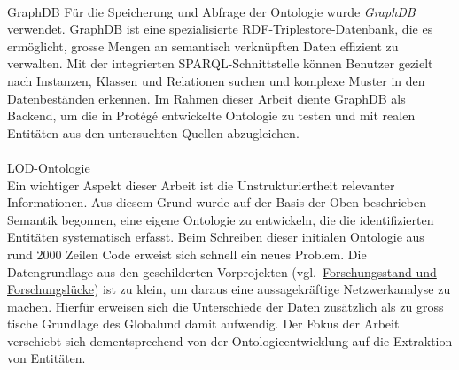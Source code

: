 \documentclass[12pt, a4paper, ngerman, bidi=default]{article}
\makeatletter
\let\oldparagraph\paragraph%
\renewcommand{\paragraph}{
    \@ifstar%
      \xxxParagraphStar%
      \xxxParagraphNoStar%
 }
\newcommand{\xxxParagraphStar}[1]{\oldparagraph*{#1}\mbox{}}
\newcommand{\xxxParagraphNoStar}[1]{\oldparagraph{#1}\mbox{}}
\makeatother
\begin{document}
\paragraph{GraphDB} Für die Speicherung und Abfrage der Ontologie wurde \textit{GraphDB} verwendet. 
GraphDB ist eine spezialisierte RDF-Triplestore-Datenbank, die es ermöglicht, 
grosse Mengen an semantisch verknüpften Daten effizient zu verwalten. 
Mit der integrierten SPARQL-Schnittstelle können Benutzer gezielt nach Instanzen, Klassen und Relationen suchen 
und komplexe Muster in den Datenbeständen erkennen. 
Im Rahmen dieser Arbeit diente GraphDB als Backend, um die in Protégé entwickelte Ontologie zu testen 
und mit realen Entitäten aus den untersuchten Quellen abzugleichen.



\noindent
\begin{minipage}[t]{0.52\textwidth}
  \justifying%
\paragraph{LOD-Ontologie}\\
Ein wichtiger Aspekt dieser Arbeit ist die Unstrukturiertheit relevanter Informationen. 
Aus diesem Grund wurde auf der Basis der Oben beschrieben Semantik begonnen, eine eigene Ontologie zu entwickeln, die die identifizierten Entitäten systematisch erfasst.
Beim Schreiben dieser initialen Ontologie aus rund 2000 Zeilen Code erweist sich schnell ein neues Problem. Die Datengrundlage aus den geschilderten Vorprojekten (vgl.~\hyperref[subsec:forschungsstand]{Forschungsstand und Forschungslücke}) ist 
zu klein, um daraus eine aussagekräftige Netzwerkanalyse zu machen. Hierfür erweisen sich die Unterschiede der Daten zusätzlich als zu gross tische Grundlage des Globalund damit aufwendig. Der Fokus der Arbeit verschiebt sich dementsprechend von der Ontologieentwicklung 
auf die Extraktion von Entitäten.
\end{minipage}%
\hfill%
\end{document}
